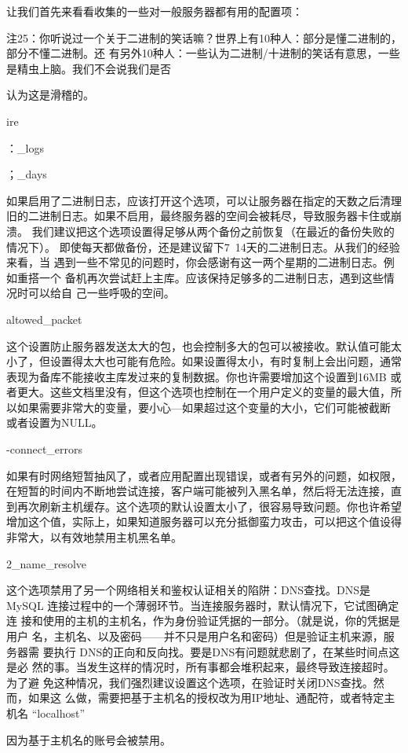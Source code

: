让我们首先来看看收集的一些对一般服务器都有用的配置项：

注25：你听说过一个关于二进制的笑话嘛？世界上有10种人：部分是懂二进制的，部分不懂二进制。还
有另外10种人：一些认为二进制/十进制的笑话有意思，一些是精虫上脑。我们不会说我们是否

认为这是滑稽的。

ire

：\_logs

；\_days

如果启用了二进制日志，应该打开这个选项，可以让服务器在指定的天数之后清理
旧的二进制日志。如果不启用，最终服务器的空间会被耗尽，导致服务器卡住或崩溃。
我们建议把这个选项设置得足够从两个备份之前恢复（在最近的备份失败的情况下）。
即使每天都做备份，还是建议留下7~14天的二进制日志。从我们的经验来看，当
遇到一些不常见的问题时，你会感谢有这一两个星期的二进制日志。例如重搭一个
备机再次尝试赶上主库。应该保持足够多的二进制日志，遇到这些情况时可以给自
己一些呼吸的空间。

altowed\_packet

这个设置防止服务器发送太大的包，也会控制多大的包可以被接收。默认值可能太
小了，但设置得太大也可能有危险。如果设置得太小，有时复制上会出问题，通常
表现为备库不能接收主库发过来的复制数据。你也许需要增加这个设置到16MB 或
者更大。这些文档里没有，但这个选项也控制在一个用户定义的变量的最大值，所
以如果需要非常大的变量，要小心—如果超过这个变量的大小，它们可能被截断
或者设置为NULL。

-connect\_errors

如果有时网络短暂抽风了，或者应用配置出现错误，或者有另外的问题，如权限，
在短暂的时间内不断地尝试连接，客户端可能被列入黑名单，然后将无法连接，直
到再次刷新主机缓存。这个选项的默认设置太小了，很容易导致问题。你也许希望
增加这个值，实际上，如果知道服务器可以充分抵御蛮力攻击，可以把这个值设得
非常大，以有效地禁用主机黑名单。

2\_name\_resolve

这个选项禁用了另一个网络相关和鉴权认证相关的陷阱：DNS查找。DNS是
MySQL 连接过程中的一个薄弱环节。当连接服务器时，默认情况下，它试图确定连
接和使用的主机的主机名，作为身份验证凭据的一部分。（就是说，你的凭据是用户
名，主机名、以及密码——并不只是用户名和密码）但是验证主机来源，服务器需
要执行 DNS的正向和反向找。要是DNS有问题就悲剧了，在某些时间点这是必
然的事。当发生这样的情况时，所有事都会堆积起来，最终导致连接超时。为了避
免这种情况，我们强烈建议设置这个选项，在验证时关闭DNS查找。然而，如果这
么做，需要把基于主机名的授权改为用IP地址、通配符，或者特定主机名 “localhost”

因为基于主机名的账号会被禁用。

